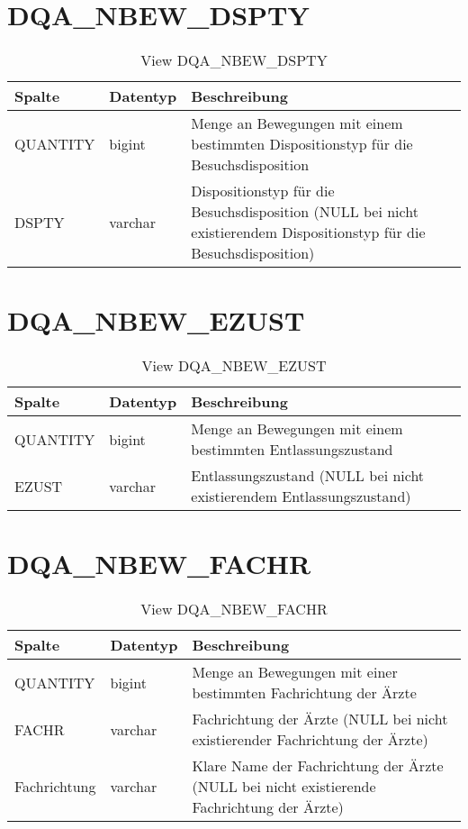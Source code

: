   \section{DQA\_NBEW\_DSPTY}

  \begin{table}[ht]
    \centering
    \caption{View DQA\_NBEW\_DSPTY}
    \label{tab:dqanbewdspty}
    \begin{tabular}{||l|l|p{10cm}||}
      \hline
      Spalte & Datentyp & Beschreibung \\ [0.5ex] \hline \hline
QUANTITY & bigint & Menge an Bewegungen mit einem bestimmten Dispositionstyp für die Besuchsdisposition \\ \hline
DSPTY & varchar & Dispositionstyp für die Besuchsdisposition (NULL bei nicht existierendem Dispositionstyp für die Besuchsdisposition)\\ \hline
    \end{tabular}
  \end{table}
  \section{DQA\_NBEW\_EZUST}

  \begin{table}[ht]
    \centering
    \caption{View DQA\_NBEW\_EZUST}
    \label{tab:dqanbewezust}
    \begin{tabular}{||l|l|p{10cm}||}
      \hline
      Spalte & Datentyp & Beschreibung \\ [0.5ex] \hline \hline
QUANTITY & bigint & Menge an Bewegungen mit einem bestimmten Entlassungszustand \\ \hline
EZUST & varchar & Entlassungszustand (NULL bei nicht existierendem Entlassungszustand)\\ \hline
    \end{tabular}
  \end{table}
 \clearpage
  \section{DQA\_NBEW\_FACHR}

  \begin{table}[ht]
    \centering
    \caption{View DQA\_NBEW\_FACHR}
    \label{tab:dqanbewfachr}
    \begin{tabular}{||l|l|p{10cm}||}
      \hline
      Spalte & Datentyp & Beschreibung \\ [0.5ex] \hline \hline
QUANTITY & bigint & Menge an Bewegungen mit einer bestimmten Fachrichtung der Ärzte \\ \hline
FACHR & varchar & Fachrichtung der Ärzte (NULL bei nicht existierender Fachrichtung der Ärzte)\\ \hline
Fachrichtung & varchar & Klare Name der Fachrichtung der Ärzte (NULL bei nicht existierende Fachrichtung der Ärzte)\\ \hline
    \end{tabular}
  \end{table}

